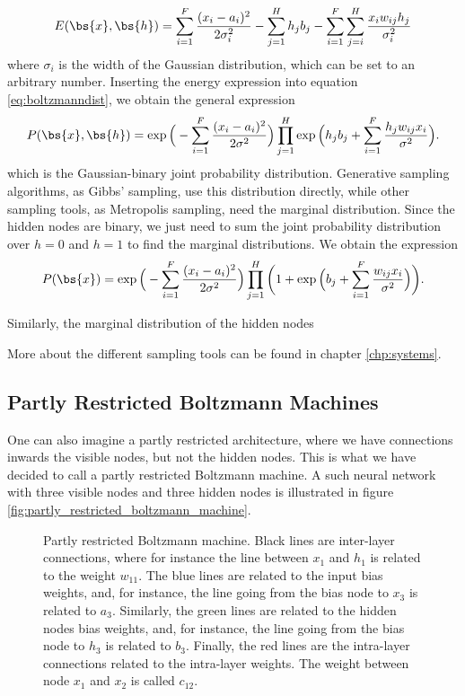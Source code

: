\begin{equation}
E(\bs{x},\bs{h})= \sum_{i=1}^F\frac{(x_i-a_i)^2}{2\sigma_i^2} - \sum_{j=1}^Hh_jb_j-\sum_{i=1}^F\sum_{j=i}^H \frac{x_iw_{ij}h_j}{\sigma_i^2} 
\label{eq:gaussianbinary}
\end{equation}
where $\sigma_i$ is the width of the Gaussian distribution, which can be set to an arbitrary number. Inserting the energy expression into equation \eqref{eq:boltzmanndist}, we obtain the general expression 
\begin{equation}
P(\bs{x},\bs{h})=\exp\Big(-\sum_{i=1}^F\frac{(x_i-a_i)^2}{2\sigma^2}\Big)\prod_{j=1}^H\exp\Big(h_jb_j+\sum_{i=1}^F\frac{h_jw_{ij}x_i}{\sigma^2}\Big).
\label{eq:NQSWF1}
\end{equation}
which is the Gaussian-binary joint probability distribution. Generative sampling algorithms, as Gibbs' sampling, use this distribution directly, while other sampling tools, as Metropolis sampling, need the marginal distribution. Since the hidden nodes are binary, we just need to sum the joint probability distribution over $h=0$ and $h=1$ to find the marginal distributions. We obtain the expression
\begin{equation}
P(\bs{x})=\exp\Big(-\sum_{i=1}^F\frac{(x_i-a_i)^2}{2\sigma^2}\Big)\prod_{j=1}^H\bigg(1+\exp\Big(b_j+\sum_{i=1}^F\frac{w_{ij}x_i}{\sigma^2}\Big)\bigg).
\label{eq:NQSWF2}
\end{equation}

Similarly, the marginal distribution of the hidden nodes 

More about the different sampling tools can be found in chapter \ref{chp:systems}.

\subsection{Partly Restricted Boltzmann Machines}
One can also imagine a partly restricted architecture, where we have connections inwards the visible nodes, but not the hidden nodes. This is what we have decided to call a partly restricted Boltzmann machine. A such neural network with three visible nodes and three hidden nodes is illustrated in figure \eqref{fig:partly_restricted_boltzmann_machine}.

\begin{figure} [H]
	\centering
	
	\caption{Partly restricted Boltzmann machine. Black lines are inter-layer connections, where for instance the line between $x_1$ and $h_1$ is related to the weight $w_{11}$. The blue lines are related to the input bias weights, and, for instance, the line going from the bias node to $x_3$ is related to $a_3$. Similarly, the green lines are related to the hidden nodes bias weights, and, for instance, the line going from the bias node to $h_3$ is related to $b_3$. Finally, the red lines are the intra-layer connections related to the intra-layer weights. The weight between node $x_1$ and $x_2$ is called $c_{12}$. }
	\label{fig:partly_restricted_boltzmann_machine}
\end{figure}

